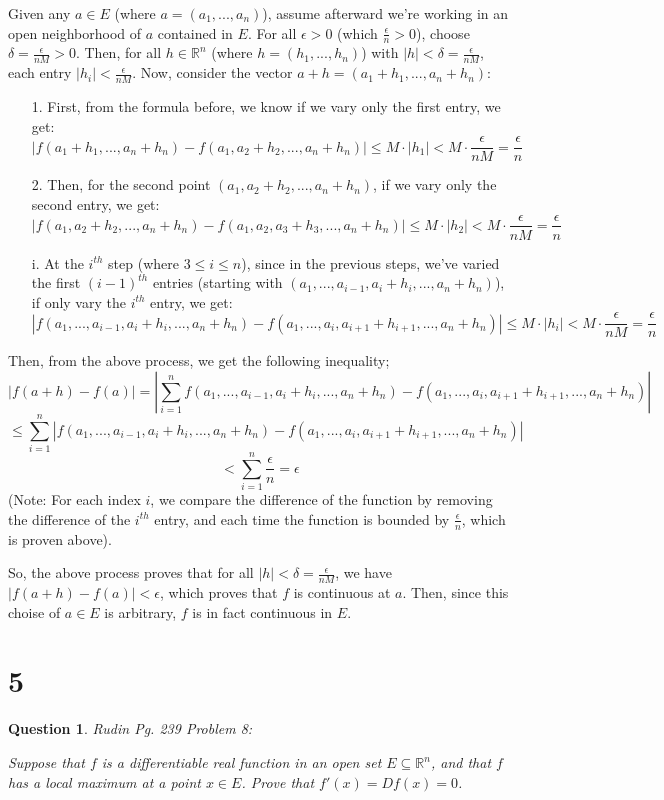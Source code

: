 \documentclass{article}
\newtheorem{question}{Question}
\begin{document}
Given any $a\in E$ (where $a=(a_1,...,a_n)$), assume afterward we're working in an open neighborhood of $a$ contained in $E$. For all $\epsilon>0$ (which $\frac{\epsilon}{n}>0$), choose $\delta=\frac{\epsilon}{nM}>0$.
Then, for all $h\in\mathbb{R}^n$ (where $h=(h_1,...,h_n)$) with $|h|<\delta=\frac{\epsilon}{nM}$,  each entry $|h_i|<\frac{\epsilon}{nM}$. Now, consider the vector $a+h=(a_1+h_1,...,a_n+h_n)$:
\begin{itemize}
    \item[1.] First, from the formula before, we know if we vary only the first entry, we get:
    $$|f(a_1+h_1,...,a_n+h_n)-f(a_1,a_2+h_2,...,a_n+h_n)|\leq M\cdot |h_1| < M\cdot \frac{\epsilon}{nM} = \frac{\epsilon}{n}$$
    \item[2.] Then, for the second point $(a_1,a_2+h_2,...,a_n+h_n)$, if we vary only the second entry, we get:
    $$|f(a_1,a_2+h_2,...,a_n+h_n)-f(a_1,a_2,a_3+h_3,...,a_n+h_n)|\leq M\cdot|h_2|<M\cdot\frac{\epsilon}{nM}=\frac{\epsilon}{n}$$
    \item[i.] At the $i^{th}$ step (where $3\leq i\leq n$), since in the previous steps, we've varied the first $(i-1)^{th}$ entries (starting with $(a_1,...,a_{i-1},a_i+h_i,...,a_n+h_n)$), if only vary the $i^{th}$ entry, we get:
    $$|f(a_1,...,a_{i-1},a_i+h_i,...,a_n+h_n)-f(a_1,...,a_i,a_{i+1}+h_{i+1},...,a_n+h_n)| \leq M\cdot|h_i|<M\cdot\frac{\epsilon}{nM}=\frac{\epsilon}{n}$$
\end{itemize}
Then, from the above process, we get the following inequality;
$$|f(a+h)-f(a)|=\left|
\sum_{i=1}^{n}f(a_1,...,a_{i-1},a_i+h_i,...,a_n+h_n)-f(a_1,...,a_i,a_{i+1}+h_{i+1},...,a_n+h_n)
\right|$$
$$\leq \sum_{i=1}^{n}|f(a_1,...,a_{i-1},a_i+h_i,...,a_n+h_n)-f(a_1,...,a_i,a_{i+1}+h_{i+1},...,a_n+h_n)|$$
$$< \sum_{i=1}^{n}\frac{\epsilon}{n}=\epsilon$$
(Note: For each index $i$, we compare the difference of the function by removing the difference of the $i^{th}$ entry, and each time the function is bounded by $\frac{\epsilon}{n}$, which is proven above).

So, the above process proves that for all $|h|<\delta=\frac{\epsilon}{nM}$, we have $|f(a+h)-f(a)|<\epsilon$, which proves that $f$ is continuous at $a$.
Then, since this choise of $a\in E$ is arbitrary, $f$ is in fact continuous in $E$.

\hfil

\hfil

\section*{5}
\begin{myBox}[]{}
    \begin{question}
        Rudin Pg. 239 Problem 8:

        Suppose that $f$ is a differentiable real function in an open set $E\subseteq \mathbb{R}^n$, 
        and that $f$ has a local maximum at a point $x\in E$. Prove that $f'(x)=Df(x)=0$.
    \end{question}
\end{myBox}
\end{document}

